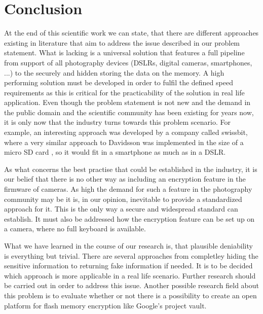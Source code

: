 \documentclass[12pt,a4paper,titlepage,oneside]{scrartcl}
\begin{document}
\newpage
\section{Conclusion}
At the end of this scientific work we can state, that there are different approaches existing in literature that aim to address the issue described in our problem statement.
What is lacking is a universal solution that features a full pipeline from support of all photography devices (DSLRs, digital cameras, smartphones, ...) to the securely and hidden storing the data on the memory.
A high performing solution must be developed in order to fulfil the defined speed requirements as this is critical for the practicability of the solution in real life application.
Even though the problem statement is not new and the demand in the public domain and the scientific community has been existing for years now, it is only now that the industry turns towards this problem scenario.
For example, an interesting approach was developed by a company called swissbit, where a very similar approach to Davidsson was implemented in the size of a micro SD card \cite{swissbit2017}, so it would fit in a smartphone as much as in a DSLR.

As what concerns the best practise that could be established in the industry, it is our belief that there is no other way as including an encryption feature in the firmware of cameras.
As high the demand for such a feature in the photography community may be it is, in our opinion, inevitable to provide a standardized approach for it.
This is the only way a secure and widespread standard can establish.
It must also be addressed how the encryption feature can be set up on a camera, where no full keyboard is available.

What we have learned in the course of our research is, that plausible deniability is everything but trivial.
There are several approaches from completley hiding the sensitive information to returning fake information if needed.
It is to be decided which approach is more applicable in a real life scenario.
Further research should be carried out in order to address this issue.
Another possible research field about this problem is to evaluate whether or not there is a possibility to create an open platform for flash memory encryption like Google's project vault.

\newpage

\listoftables

\newpage




\end{document}
